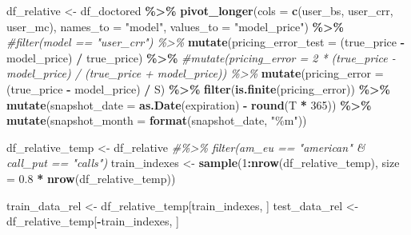 \documentclass[
]{article}
\newenvironment{Shaded}{\begin{snugshade}}{\end{snugshade}}
\newcommand{\AttributeTok}[1]{\textcolor[rgb]{0.13,0.29,0.53}{#1}}
\newcommand{\CommentTok}[1]{\textcolor[rgb]{0.56,0.35,0.01}{\textit{#1}}}
\newcommand{\DecValTok}[1]{\textcolor[rgb]{0.00,0.00,0.81}{#1}}
\newcommand{\FloatTok}[1]{\textcolor[rgb]{0.00,0.00,0.81}{#1}}
\newcommand{\FunctionTok}[1]{\textcolor[rgb]{0.13,0.29,0.53}{\textbf{#1}}}
\newcommand{\NormalTok}[1]{#1}
\newcommand{\OtherTok}[1]{\textcolor[rgb]{0.56,0.35,0.01}{#1}}
\newcommand{\SpecialCharTok}[1]{\textcolor[rgb]{0.81,0.36,0.00}{\textbf{#1}}}
\newcommand{\StringTok}[1]{\textcolor[rgb]{0.31,0.60,0.02}{#1}}
\begin{document}
\begin{Shaded}
\begin{Highlighting}[]
\NormalTok{df\_relative }\OtherTok{\textless{}{-}}\NormalTok{ df\_doctored }\SpecialCharTok{\%\textgreater{}\%}
  \FunctionTok{pivot\_longer}\NormalTok{(}\AttributeTok{cols =} \FunctionTok{c}\NormalTok{(user\_bs, user\_crr, user\_mc),}
               \AttributeTok{names\_to =} \StringTok{"model"}\NormalTok{,}
               \AttributeTok{values\_to =} \StringTok{"model\_price"}\NormalTok{) }\SpecialCharTok{\%\textgreater{}\%}
  \CommentTok{\#filter(model == "user\_crr") \%\textgreater{}\%}
  \FunctionTok{mutate}\NormalTok{(}\AttributeTok{pricing\_error\_test =}\NormalTok{ (true\_price }\SpecialCharTok{{-}}\NormalTok{ model\_price) }\SpecialCharTok{/}\NormalTok{ true\_price) }\SpecialCharTok{\%\textgreater{}\%}
  \CommentTok{\#mutate(pricing\_error = 2 * (true\_price {-} model\_price) / (true\_price + model\_price)) \%\textgreater{}\%}
  \FunctionTok{mutate}\NormalTok{(}\AttributeTok{pricing\_error =}\NormalTok{ (true\_price }\SpecialCharTok{{-}}\NormalTok{ model\_price) }\SpecialCharTok{/}\NormalTok{ S) }\SpecialCharTok{\%\textgreater{}\%}
  \FunctionTok{filter}\NormalTok{(}\FunctionTok{is.finite}\NormalTok{(pricing\_error)) }\SpecialCharTok{\%\textgreater{}\%}
  \FunctionTok{mutate}\NormalTok{(}\AttributeTok{snapshot\_date =} \FunctionTok{as.Date}\NormalTok{(expiration) }\SpecialCharTok{{-}} \FunctionTok{round}\NormalTok{(T }\SpecialCharTok{*} \DecValTok{365}\NormalTok{)) }\SpecialCharTok{\%\textgreater{}\%}
  \FunctionTok{mutate}\NormalTok{(}\AttributeTok{snapshot\_month =} \FunctionTok{format}\NormalTok{(snapshot\_date, }\StringTok{"\%m"}\NormalTok{))}
\end{Highlighting}
\end{Shaded}

\begin{Shaded}
\begin{Highlighting}[]
\NormalTok{df\_relative\_temp }\OtherTok{\textless{}{-}}\NormalTok{ df\_relative }\CommentTok{\#\%\textgreater{}\% filter(am\_eu == "american" \& call\_put == "calls")}
\NormalTok{train\_indexes }\OtherTok{\textless{}{-}} \FunctionTok{sample}\NormalTok{(}\DecValTok{1}\SpecialCharTok{:}\FunctionTok{nrow}\NormalTok{(df\_relative\_temp), }\AttributeTok{size =} \FloatTok{0.8} \SpecialCharTok{*} \FunctionTok{nrow}\NormalTok{(df\_relative\_temp))}

\NormalTok{train\_data\_rel }\OtherTok{\textless{}{-}}\NormalTok{ df\_relative\_temp[train\_indexes, ]}
\NormalTok{test\_data\_rel }\OtherTok{\textless{}{-}}\NormalTok{ df\_relative\_temp[}\SpecialCharTok{{-}}\NormalTok{train\_indexes, ]}
\end{Highlighting}
\end{Shaded}
\end{document}
